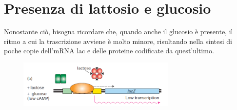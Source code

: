 \documentclass[10pt,a4paper]{article}
\begin{document}
	
	\section{Presenza di lattosio e glucosio}
	
	Nonostante ciò, bisogna ricordare che, quando anche il glucosio è presente, il ritmo a cui la trascrizione avviene è molto minore, risultando nella sintesi di poche copie dell'mRNA lac e delle proteine codificate da quest'ultimo.
	


\begin{figure}[h]
	\centering
	\includegraphics[width=0.7\textwidth]{operone si lac.png}
\end{figure}
	
	
\end{document}
